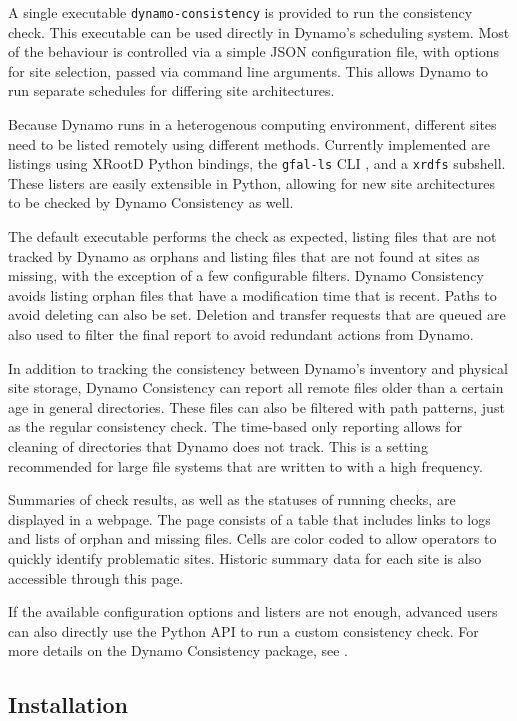 A single executable \texttt{dynamo-consistency} is provided to run the consistency check.
This executable can be used directly in Dynamo’s scheduling system.
Most of the behaviour is controlled via a simple JSON configuration file,
with options for site selection, passed via command line arguments.
This allows Dynamo to run separate schedules for differing site architectures.

Because Dynamo runs in a heterogenous computing environment,
different sites need to be listed remotely using different methods.
Currently implemented are listings using XRootD Python bindings,
the \texttt{gfal-ls} CLI \cite{laure2006programming}, and a \texttt{xrdfs} subshell.
These listers are easily extensible in Python,
allowing for new site architectures to be checked by Dynamo Consistency as well.

The default executable performs the check as expected,
listing files that are not tracked by Dynamo as orphans
and listing files that are not found at sites as missing,
with the exception of a few configurable filters.
Dynamo Consistency avoids listing orphan files that have a modification time that is recent.
Paths to avoid deleting can also be set.
Deletion and transfer requests that are queued are also used to filter the final report
to avoid redundant actions from Dynamo.

In addition to tracking the consistency between Dynamo’s inventory and physical site storage,
Dynamo Consistency can report all remote files older than a certain age
in general directories.
These files can also be filtered with path patterns, just as the regular consistency check.
The time-based only reporting allows for cleaning of directories that Dynamo does not track.
This is a setting recommended for large file systems
that are written to with a high frequency.

Summaries of check results, as well as the statuses of running checks,
are displayed in a webpage.
The page consists of a table that includes links to logs and
lists of orphan and missing files.
Cells are color coded to allow operators to quickly identify problematic sites.
Historic summary data for each site is also accessible through this page.

If the available configuration options and listers are not enough,
advanced users can also directly use the Python API to run a custom consistency check.
For more details on the Dynamo Consistency package,
see \cite{dynamo_consistency}.

\subsection{Installation}

